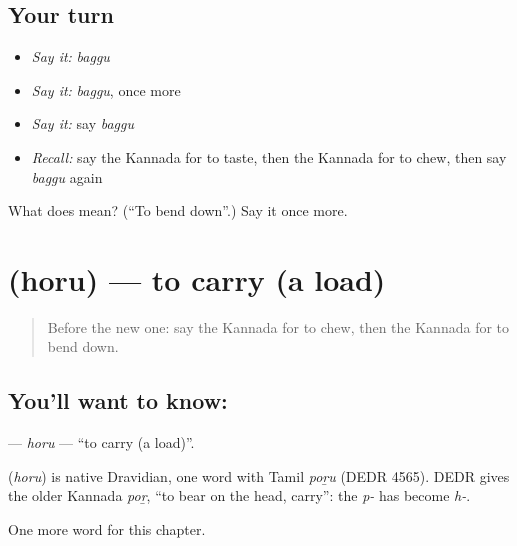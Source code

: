 \subsection*{Your turn}
\begin{itemize}
\raggedright
  \item \emph{Say it:} \emph{baggu}
  \item \emph{Say it:} \emph{baggu}, once more
  \item \emph{Say it:} say \emph{baggu}
  \item \emph{Recall:} say the Kannada for to taste, then the Kannada for to chew, then say \emph{baggu} again
\end{itemize}

\begin{tcolorbox}[breakable,colback=teal!4,colframe=teal!35!black,title={Before you move on}]
What does  mean? (\textquotedblleft{}To bend down\textquotedblright{}.) Say it once more.
\end{tcolorbox}
\section[\texorpdfstring{\kn{ಹೊರು} (horu)}{ಹೊರು (horu)}]{ (horu) — to carry (a load)}

\label{lesson:KA-C160-horu}



\begin{quote}
Before the new one: say the Kannada for to chew, then the Kannada for to bend down.
\end{quote}

\subsection*{You'll want to know: }
\textbf{} — \emph{horu} — \textquotedblleft{}to carry (a load)\textquotedblright{}.

\begin{cousinweb}
\textbf{} (\emph{horu}) is native Dravidian, one word with Tamil \emph{poṟu} (DEDR 4565). DEDR gives the older Kannada \emph{poṟ}, \textquotedblleft{}to bear on the head, carry\textquotedblright{}: the \emph{p-} has become \emph{h-}.
\end{cousinweb}

\begin{grammarlens}[title={What you've built}]
One more word for this chapter.
\end{grammarlens}

